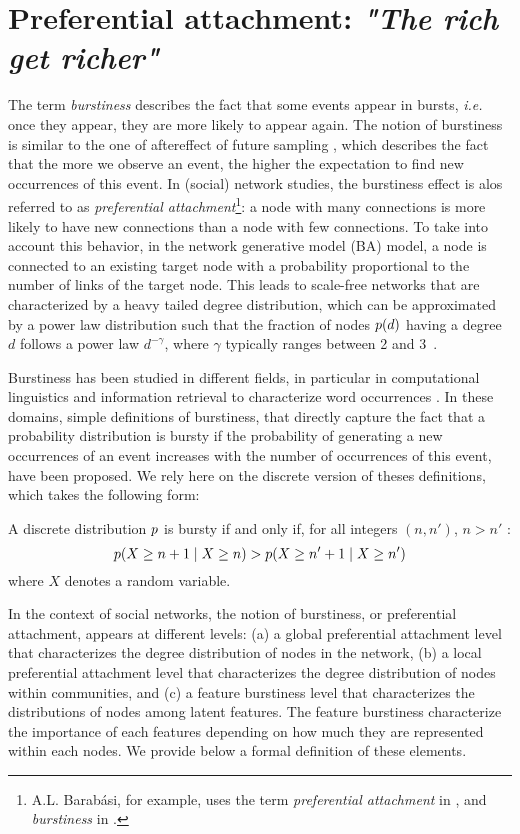 \section{Preferential attachment: \emph{"The rich get richer"}}
\label{sec:burstiness}

The term \textit{burstiness} describes the fact that some events appear in bursts, \textit{i.e.} once they appear, they are more likely to appear again. The notion of burstiness is similar to the one of aftereffect of future sampling \cite{feller_68}, which describes the fact that the more we observe an event, the higher the expectation to find new occurrences of this event. In (social) network studies, the burstiness effect is alos referred to as \textit{preferential attachment}\footnote{A.L. Barab\'asi, for example, uses the term \textit{preferential attachment} in \cite{barabasi1999emergence}, and \textit{burstiness} in \cite{barabasi_burst}.}: a node with many connections is more likely to have new connections than a node with few connections. To take into account this behavior, in the network generative model  (BA) \cite{albert2002statistical} model, a node is connected to an existing target node with a probability proportional to the number of links of the target node. This leads to scale-free networks that are characterized by a heavy tailed degree distribution, which can be approximated by a power law distribution such that the fraction of nodes $p(d)$ having a degree $d$ follows a power law $d^{-\gamma}$, where $\gamma$ typically ranges between 2 and 3~\cite{barabasi1999emergence}. 

Burstiness has been studied in different fields, in particular in computational linguistics and information retrieval to characterize word occurrences \cite{church1995poisson}. In these domains, simple definitions of burstiness, that directly capture the fact that a probability distribution is bursty if the probability of generating a new occurrences of an event increases with the number of occurrences of this event, have been proposed\cite{clinchant2008bnb,clinchant2010information}. We rely here on the discrete version of theses definitions, which takes the following form:
%
\begin{definition}[Burstiness]
	A discrete distribution $p$ is bursty if and only if, for all integers $(n, n')$, $n > n'$ :
	\begin{equation}
	p(X \geq n+1 \mid X \geq n) > p(X \geq n'+1 \mid X \geq n') \nonumber
	\end{equation}
	where $X$ denotes a random variable.
\label{def:burst}
\end{definition}
%
In the context of social networks, the notion of burstiness, or preferential attachment, appears at different levels: (a) a global preferential attachment level that characterizes the degree distribution of nodes in the network, (b) a local preferential attachment level that characterizes the degree distribution of nodes within communities, and (c) a feature burstiness level that characterizes the distributions of nodes among latent features. The feature burstiness characterize the importance of each features depending on how much they are represented within each nodes. We provide below a formal definition of these elements.
%

